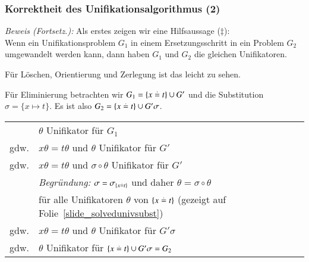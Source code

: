 \documentclass[aspectratio=1610,onlymath]{beamer}
\begin{document}
\begin{frame}[t]\frametitle{Korrektheit des Unifikationsalgorithmus (2)}


\emph{Beweis (Fortsetz.):} Als erstes zeigen wir eine Hilfsaussage ($\ddagger$):\\[1ex]
Wenn ein Unifikationsproblem $G_1$ in einem Ersetzungsschritt in ein Problem $G_2$
umgewandelt werden kann, dann haben $G_1$ und $G_2$ die gleichen Unifikatoren.
\bigskip\pause

Für \alert{Löschen}, \alert{Orientierung} und \alert{Zerlegung} ist das leicht zu sehen.\medskip\pause

Für \alert{Eliminierung} betrachten wir $G_1=\{x\stackrel{.}{=} t\}\cup G'$ und die Substitution
$\sigma=\{x\mapsto t\}$. Es ist also $G_2=\{x\stackrel{.}{=} t\}\cup G'\sigma$.\medskip\pause

\begin{tabular}{rl}
	 & $\theta$ Unifikator für $G_1$ \pause\\[-0.5ex]
gdw. & $x\theta=t\theta$ und $\theta$ Unifikator für $G'$ \pause\\[-0.5ex]
gdw. & $x\theta=t\theta$ und $\sigma\circ\theta$ Unifikator für $G'$ \\[-1ex]
	& \emph{Begründung:} $\sigma=\sigma_{\{x\stackrel{.}{=} t\}}$ und daher $\theta=\sigma\circ\theta$\\[-1ex]
	& für alle Unifikatoren $\theta$ von $\{x\stackrel{.}{=} t\}$ (gezeigt auf Folie~\ref{slide_solvedunivsubst})\pause\\[-0.5ex]
gdw. & $x\theta=t\theta$ und $\theta$ Unifikator für $G'\sigma$ \pause\\[-0.5ex]
gdw. & $\theta$ Unifikator für $\{x\stackrel{.}{=} t\}\cup G'\sigma=G_2$
\end{tabular}

\end{frame}
\end{document}
